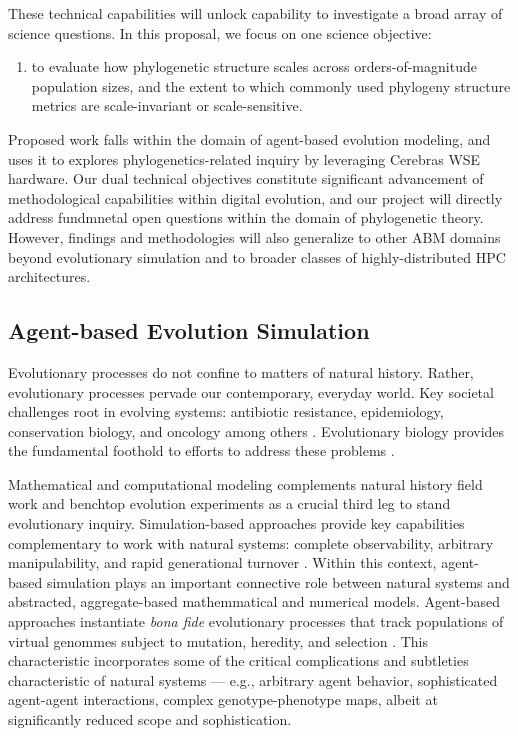 These technical capabilities will unlock capability to investigate a broad array of science questions.
In this proposal, we focus on one science objective:
\begin{enumerate}
\item to evaluate how phylogenetic structure scales across orders-of-magnitude population sizes, and the extent to which commonly used phylogeny structure metrics are scale-invariant or scale-sensitive.
\end{enumerate}

Proposed work falls within the domain of agent-based evolution modeling, and uses it to explores phylogenetics-related inquiry by leveraging Cerebras WSE hardware.
Our dual technical objectives constitute significant advancement of methodological capabilities within digital evolution, and our project will directly address fundmnetal open questions within the domain of phylogenetic theory.
However, findings and methodologies will also generalize to other ABM domains beyond evolutionary simulation and to broader classes of highly-distributed HPC architectures.

\subsection{Agent-based Evolution Simulation}

Evolutionary processes do not confine to matters of natural history.
Rather, evolutionary processes pervade our contemporary, everyday world.
Key societal challenges root in evolving systems: antibiotic resistance, epidemiology, conservation biology, and oncology among others \citep{TODO, TODO}.
Evolutionary biology provides the fundamental foothold to efforts to address these problems \citep{evolutionasbaseforoncology}.

Mathematical and computational modeling complements natural history field work and benchtop evolution experiments as a crucial third leg to stand evolutionary inquiry.
Simulation-based approaches provide key capabilities complementary to work with natural systems: complete observability, arbitrary manipulability, and rapid generational turnover \citep{pennock}.
Within this context, agent-based simulation plays an important connective role between natural systems and abstracted, aggregate-based mathemmatical and numerical models.
Agent-based approaches instantiate \textit{bona fide} evolutionary processes that track populations of virtual genommes subject to mutation, heredity, and selection \citep{pennnock}.
This characteristic incorporates some of the critical complications and subtleties characteristic of natural systems --- e.g., arbitrary agent behavior, sophisticated agent-agent interactions, complex genotype-phenotype maps, albeit at significantly reduced scope and sophistication.

